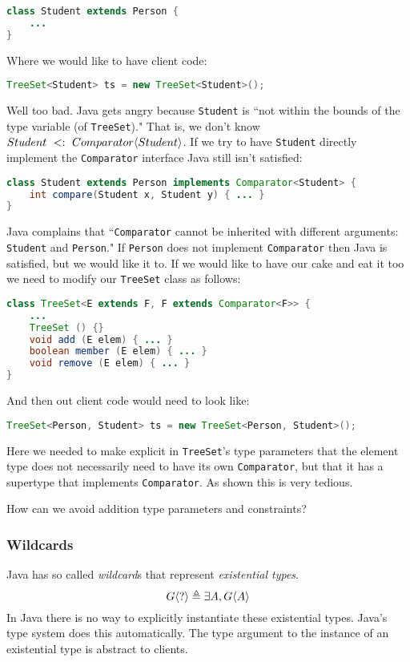\documentclass{article}
\begin{document}
\begin{example}
\begin{lstlisting}[language=Java]
class Student extends Person {
    ...
}
\end{lstlisting}
Where we would like to have client code:
\begin{lstlisting}[language=Java]
TreeSet<Student> ts = new TreeSet<Student>();
\end{lstlisting}
Well too bad.
Java gets angry because \texttt{Student} is ``not within the bounds of the type variable (of \texttt{TreeSet})."
That is, we don't know $Student ~ <: ~ Comparator \langle Student \rangle$.
If we try to have \texttt{Student} directly implement the \texttt{Comparator} interface Java still isn't satisfied:
\begin{lstlisting}[language=Java]
class Student extends Person implements Comparator<Student> {
    int compare(Student x, Student y) { ... }
}
\end{lstlisting}
Java complains that ``\texttt{Comparator} cannot be inherited with different arguments: \texttt{Student} and \texttt{Person}."
If \texttt{Person} does not implement \texttt{Comparator} then Java is satisfied, but we would like it to.
If we would like to have our cake and eat it too we need to modify our \texttt{TreeSet} class as follows:
\begin{lstlisting}[language=Java]
class TreeSet<E extends F, F extends Comparator<F>> {
    ...
    TreeSet () {}
    void add (E elem) { ... }
    boolean member (E elem) { ... }
    void remove (E elem) { ... }
}
\end{lstlisting}
And then out client code would need to look like:
\begin{lstlisting}[language=Java]
TreeSet<Person, Student> ts = new TreeSet<Person, Student>();
\end{lstlisting}
Here we needed to make explicit in \texttt{TreeSet}'s type parameters that the element type does not necessarily need to have its own \texttt{Comparator}, but that it has a supertype that implements \texttt{Comparator}.
As shown this is very tedious.
\end{example}

How can we avoid addition type parameters and constraints?

\subsubsection{Wildcards}

\begin{definition}[Wildcards]
Java has so called \textit{wildcard}s that represent \textit{existential types}.
\begin{equation}
G \langle ? \rangle \triangleq \exists A, G \langle A \rangle
\end{equation}
In Java there is no way to explicitly instantiate these existential types.
Java's type system does this automatically.
The type argument to the instance of an existential type is abstract to clients.
\end{definition}
\end{document}
